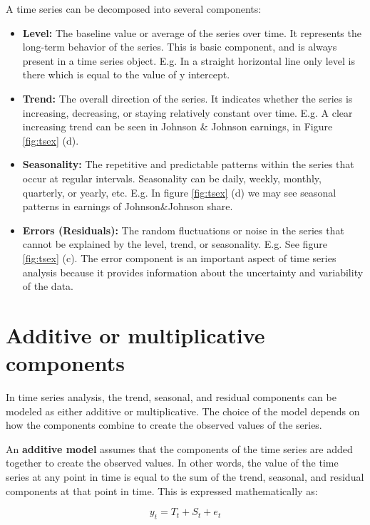 \documentclass[
]{book}
\providecommand{\tightlist}{%
  \setlength{\itemsep}{0pt}\setlength{\parskip}{0pt}}
\begin{document}
A time series can be decomposed into several components:

\begin{itemize}
\tightlist
\item
  \textbf{Level:} The baseline value or average of the series over time. It represents the long-term behavior of the series. This is basic component, and is always present in a time series object. E.g. In a straight horizontal line only level is there which is equal to the value of y intercept.
\item
  \textbf{Trend:} The overall direction of the series. It indicates whether the series is increasing, decreasing, or staying relatively constant over time. E.g. A clear increasing trend can be seen in Johnson \& Johnson earnings, in Figure \ref{fig:tsex} (d).
\item
  \textbf{Seasonality:} The repetitive and predictable patterns within the series that occur at regular intervals. Seasonality can be daily, weekly, monthly, quarterly, or yearly, etc. E.g. In figure \ref{fig:tsex} (d) we may see seasonal patterns in earnings of Johnson\&Johnson share.
\item
  \textbf{Errors (Residuals):} The random fluctuations or noise in the series that cannot be explained by the level, trend, or seasonality. E.g. See figure \ref{fig:tsex} (c). The error component is an important aspect of time series analysis because it provides information about the uncertainty and variability of the data.
\end{itemize}

\hypertarget{additive-or-multiplicative-components}{%
\section{Additive or multiplicative components}\label{additive-or-multiplicative-components}}

In time series analysis, the trend, seasonal, and residual components can be modeled as either additive or multiplicative. The choice of the model depends on how the components combine to create the observed values of the series.

An \textbf{additive model} assumes that the components of the time series are added together to create the observed values. In other words, the value of the time series at any point in time is equal to the sum of the trend, seasonal, and residual components at that point in time. This is expressed mathematically as:

\[
y_t = T_t + S_t + e_t
\]
\end{document}

